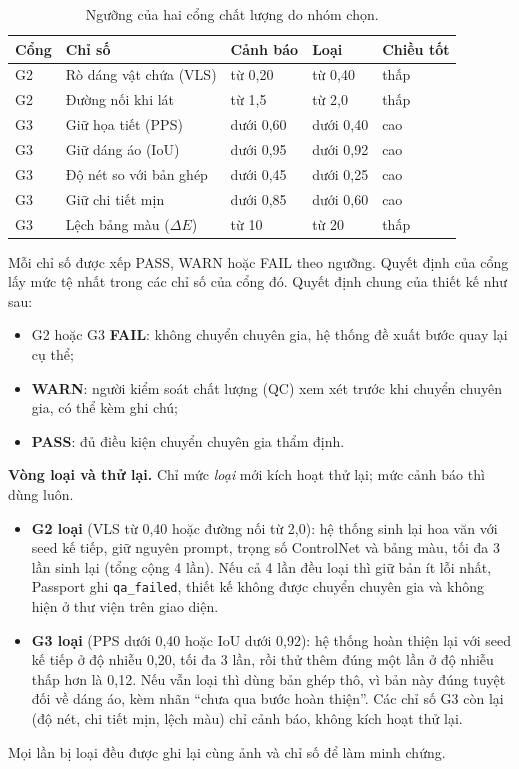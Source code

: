 \documentclass[12pt,a4paper]{report}
\begin{document}
\begin{table}[H]
\centering
\small
\caption{Ngưỡng của hai cổng chất lượng do nhóm chọn.}
\label{tab:nguong}
\begin{tabularx}{\textwidth}{>{\raggedright\arraybackslash}p{1.6cm}>{\raggedright\arraybackslash}X>{\centering\arraybackslash}p{1.9cm}>{\centering\arraybackslash}p{1.6cm}>{\raggedright\arraybackslash}p{2.0cm}}
\toprule
\textbf{Cổng} & \textbf{Chỉ số} & \textbf{Cảnh báo} & \textbf{Loại} & \textbf{Chiều tốt} \\
\midrule
G2 & Rò dáng vật chứa (VLS) & từ 0,20 & từ 0,40 & thấp \\
G2 & Đường nối khi lát & từ 1,5 & từ 2,0 & thấp \\
G3 & Giữ họa tiết (PPS) & dưới 0,60 & dưới 0,40 & cao \\
G3 & Giữ dáng áo (IoU) & dưới 0,95 & dưới 0,92 & cao \\
G3 & Độ nét so với bản ghép & dưới 0,45 & dưới 0,25 & cao \\
G3 & Giữ chi tiết mịn & dưới 0,85 & dưới 0,60 & cao \\
G3 & Lệch bảng màu ($\Delta E$) & từ 10 & từ 20 & thấp \\
\bottomrule
\end{tabularx}
\end{table}

Mỗi chỉ số được xếp PASS, WARN hoặc FAIL theo ngưỡng. Quyết định của cổng lấy mức tệ nhất trong các chỉ số của cổng đó. Quyết định chung của thiết kế như sau:
\begin{itemize}
  \item G2 hoặc G3 \textbf{FAIL}: không chuyển chuyên gia, hệ thống đề xuất bước quay lại cụ thể;
  \item \textbf{WARN}: người kiểm soát chất lượng (QC) xem xét trước khi chuyển chuyên gia, có thể kèm ghi chú;
  \item \textbf{PASS}: đủ điều kiện chuyển chuyên gia thẩm định.
\end{itemize}

\textbf{Vòng loại và thử lại.} Chỉ mức \emph{loại} mới kích hoạt thử lại; mức cảnh báo thì dùng luôn.
\begin{itemize}
  \item \textbf{G2 loại} (VLS từ 0,40 hoặc đường nối từ 2,0): hệ thống sinh lại hoa văn với seed kế tiếp, giữ nguyên prompt, trọng số ControlNet và bảng màu, tối đa 3 lần sinh lại (tổng cộng 4 lần). Nếu cả 4 lần đều loại thì giữ bản ít lỗi nhất, Passport ghi \texttt{qa\_failed}, thiết kế không được chuyển chuyên gia và không hiện ở thư viện trên giao diện.
  \item \textbf{G3 loại} (PPS dưới 0,40 hoặc IoU dưới 0,92): hệ thống hoàn thiện lại với seed kế tiếp ở độ nhiễu 0,20, tối đa 3 lần, rồi thử thêm đúng một lần ở độ nhiễu thấp hơn là 0,12. Nếu vẫn loại thì dùng bản ghép thô, vì bản này đúng tuyệt đối về dáng áo, kèm nhãn “chưa qua bước hoàn thiện”. Các chỉ số G3 còn lại (độ nét, chi tiết mịn, lệch màu) chỉ cảnh báo, không kích hoạt thử lại.
\end{itemize}
Mọi lần bị loại đều được ghi lại cùng ảnh và chỉ số để làm minh chứng.
\end{document}
